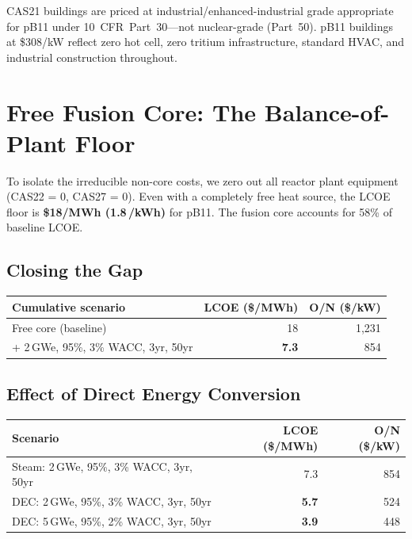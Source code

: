 \documentclass[11pt,a4paper]{article}
\begin{document}
CAS21 buildings are priced at industrial/enhanced-industrial grade
appropriate for pB11 under 10~CFR~Part~30---not nuclear-grade
(Part~50).  pB11 buildings at \$308/kW reflect zero hot cell, zero
tritium infrastructure, standard HVAC, and industrial construction
throughout.


\section{Free Fusion Core: The Balance-of-Plant Floor}

To isolate the irreducible non-core costs, we zero out all reactor
plant equipment (CAS22 = 0, CAS27 = 0).  Even with a completely free
heat source, the LCOE floor is \textbf{\$18/MWh (1.8\,\textcent/kWh)}
for pB11.  The fusion core accounts for 58\% of baseline LCOE.

\subsection{Closing the Gap}

\begin{center}
\begin{tabular}{lrr}
\toprule
Cumulative scenario & LCOE (\$/MWh) & O/N (\$/kW) \\
\midrule
Free core (baseline) & 18 & 1{,}231 \\
+ 2\,GWe, 95\%, 3\% WACC, 3yr, 50yr & \textbf{7.3} & 854 \\
\bottomrule
\end{tabular}
\end{center}

\subsection{Effect of Direct Energy Conversion}

\begin{center}
\begin{tabular}{lrr}
\toprule
Scenario & LCOE (\$/MWh) & O/N (\$/kW) \\
\midrule
Steam: 2\,GWe, 95\%, 3\% WACC, 3yr, 50yr & 7.3 & 854 \\
DEC: 2\,GWe, 95\%, 3\% WACC, 3yr, 50yr & \textbf{5.7} & 524 \\
DEC: 5\,GWe, 95\%, 2\% WACC, 3yr, 50yr & \textbf{3.9} & 448 \\
\bottomrule
\end{tabular}
\end{center}
\end{document}
